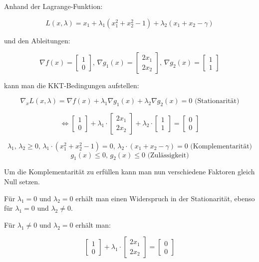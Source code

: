 \documentclass[a4paper, 12pt]{report}
\begin{document}
Anhand der Lagrange-Funktion:

$$L(x, \lambda) = x_1 + \lambda_1(x_1^2 + x_2^2 - 1) + \lambda_2(x_1 + x_2 - \gamma)$$

und den Ableitungen:

$$\nabla f(x) = \begin{bmatrix}1 \\ 0\end{bmatrix} \text{, } \nabla g_1(x) = \begin{bmatrix}2x_1\\2x_2\end{bmatrix} \text{, } \nabla g_2(x) = \begin{bmatrix}1\\1\end{bmatrix}$$

kann man die KKT-Bedingungen aufstellen:

$$\nabla_x L(x, \lambda) = \nabla f(x) + \lambda_1\nabla g_1(x) + \lambda_2\nabla g_2(x) = 0 \text{ (Stationarität)}$$

$$ \Leftrightarrow \begin{bmatrix}1\\0\end{bmatrix} + \lambda_1\cdot \begin{bmatrix}2x_1\\2x_2\end{bmatrix} + \lambda_2\cdot \begin{bmatrix}1\\1\end{bmatrix} = \begin{bmatrix}0\\0\end{bmatrix}$$

$$\lambda_1\text{, } \lambda_2 \geq 0\text{, } \lambda_1\cdot (x_1^2 + x_2^2 - 1) = 0 \text{, } \lambda_2\cdot (x_1 + x_2 - \gamma) = 0 \text{ (Komplementarität)}$$
$$g_1(x) \leq 0 \text{, } g_2(x) \leq 0 \text{ (Zulässigkeit)}$$

Um die Komplementarität zu erfüllen kann man nun verschiedene Faktoren gleich Null setzen.\par

Für $\lambda_1 = 0$ und $\lambda_2 = 0$ erhält man einen Widerspruch in der Stationarität, ebenso für
$\lambda_1 = 0$ und $\lambda_2 \neq 0$.\par
Für $\lambda_1 \neq 0$ und $\lambda_2 = 0$ erhält man:

$$\begin{bmatrix}1\\0\end{bmatrix} + \lambda_1 \cdot \begin{bmatrix}2x_1\\2x_2\end{bmatrix} = \begin{bmatrix}0\\0\end{bmatrix}$$
\end{document}
